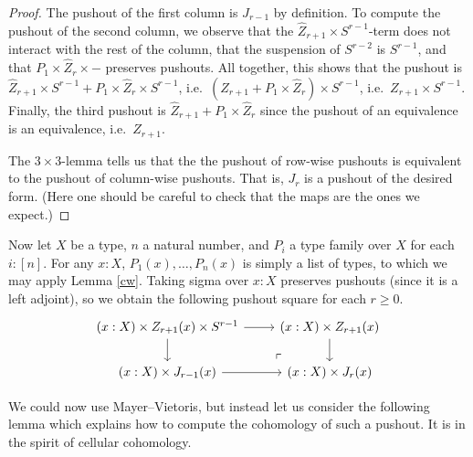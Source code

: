 \begin{proof}
The pushout of the first column is $J_{r-1}$ by definition.
To compute the pushout of the second column, we observe that the 
$\widehat Z_{r+1} \times S^{r-1}$-term does not interact with the rest of the column,
that the suspension of $S^{r-2}$ is $S^{r-1}$, and that $P_1 \times \widehat Z_r \times -$
preserves pushouts. All together, this shows that
the pushout is $\widehat Z_{r+1} \times S^{r-1} + P_1 \times \widehat Z_r \times S^{r-1}$,
i.e.\ $(\widehat Z_{r+1} + P_1 \times \widehat Z_r) \times S^{r-1}$,
i.e.\ $Z_{r+1} \times S^{r-1}$.
Finally, the third pushout is 
$\widehat Z_{r+1} + P_1 \times \widehat Z_r$ since the pushout of an equivalence
is an equivalence, i.e.\ $Z_{r+1}$.

The $3 \times 3$-lemma tells us that the the pushout of row-wise pushouts is equivalent
to the pushout of column-wise pushouts. That is, 
$J_r$ is a pushout of the desired form. (Here one should be careful to
		check that the maps are the ones we expect.)
\end{proof}

Now let $X$ be a type, $n$ a natural number, and $P_i$ a type family over
$X$ for each $i : [n]$. For any $x : X$,
$P_1(x), \ldots, P_n(x)$ is simply a list of types, to which we may apply
Lemma \ref{cw}.
Taking sigma over $x : X$ preserves pushouts (since it is a left adjoint),
	   so we obtain the following pushout square for each $r \ge 0$.
\begin{equation}\label{sigma-po}
\begin{tikzcd}
(x : X) \times Z_{r+1}(x) \times S^{r-1} \arrow[r] \arrow[d]
	& (x : X) \times Z_{r+1}(x) \arrow[d] \\
	(x : X) \times J_{r-1}(x) \arrow[r] &
	(x : X) \times J_r(x)
	\arrow[ul, phantom, "\ulcorner" , very near start]
\end{tikzcd}
\end{equation}

We could now use Mayer--Vietoris, %
but instead let us
consider the following lemma which explains how to compute the cohomology of such a pushout.
It is in the spirit of cellular cohomology. 

